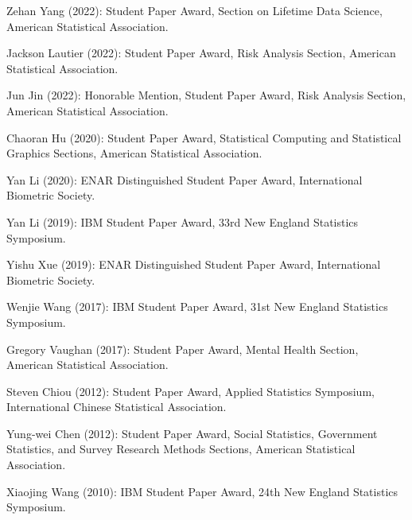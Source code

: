 \documentclass[Statistics]{vita}
\begin{document}
\begin{vita}
\begin{TeachingAccomplishments}
\begin{StudentAwards}
    \item Zehan Yang (2022): Student Paper Award, Section on Lifetime Data Science, American Statistical Association.
    \item Jackson Lautier (2022): Student Paper Award, Risk Analysis Section, American Statistical Association.
    \item Jun Jin (2022): Honorable Mention, Student Paper Award, Risk Analysis Section, American Statistical Association.
    \item Chaoran Hu (2020): Student Paper Award, Statistical Computing and Statistical Graphics Sections, American Statistical Association.
    \item Yan Li (2020): ENAR Distinguished Student Paper Award, International Biometric Society.
    \item Yan Li (2019): IBM Student Paper Award, 33rd New England Statistics Symposium.
    \item Yishu Xue (2019): ENAR Distinguished Student Paper Award, International Biometric Society.
    \item Wenjie Wang (2017): IBM Student Paper Award, 31st New England Statistics Symposium.
    \item Gregory Vaughan (2017): Student Paper Award, Mental Health Section, American Statistical Association.
    \item Steven Chiou (2012): Student Paper Award, Applied Statistics Symposium, International Chinese Statistical Association.
    \item Yung-wei Chen (2012): Student Paper Award,  Social Statistics, Government Statistics, and Survey Research Methods Sections,  American Statistical Association.
    \item Xiaojing Wang (2010): IBM Student Paper Award, 24th New England Statistics Symposium.
    \end{StudentAwards}

\end{TeachingAccomplishments}
\end{vita}
\end{document}

